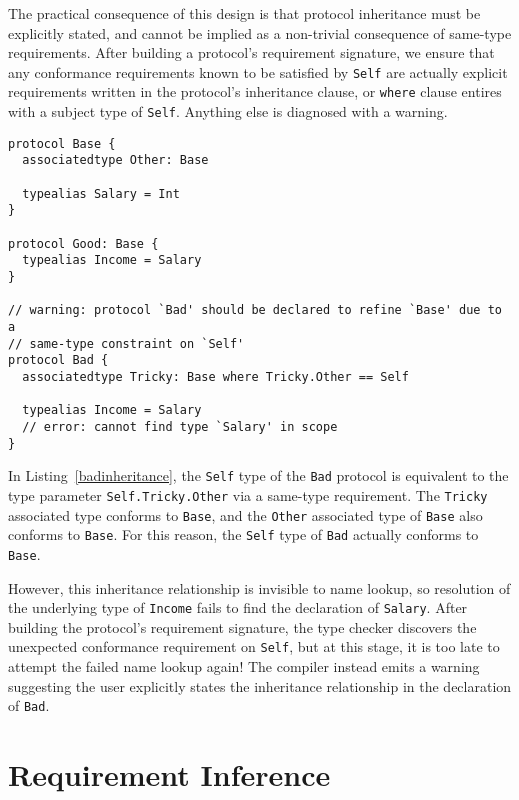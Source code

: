 \documentclass[../generics]{subfiles}
\begin{document}
The practical consequence of this design is that protocol inheritance must be explicitly stated, and cannot be implied as a non-trivial consequence of same-type requirements. After building a protocol's requirement signature, we ensure that any conformance requirements known to be satisfied by \texttt{Self} are actually explicit requirements written in the protocol's inheritance clause, or \texttt{where} clause entires with a subject type of \texttt{Self}. Anything else is diagnosed with a warning.

\begin{listing}\label{badinheritance}
\begin{Verbatim}
protocol Base {
  associatedtype Other: Base
  
  typealias Salary = Int
}

protocol Good: Base {
  typealias Income = Salary
}

// warning: protocol `Bad' should be declared to refine `Base' due to a
// same-type constraint on `Self'
protocol Bad {
  associatedtype Tricky: Base where Tricky.Other == Self
  
  typealias Income = Salary
  // error: cannot find type `Salary' in scope
}
\end{Verbatim}
\end{listing}
\begin{example}
In Listing~\ref{badinheritance}, the \texttt{Self} type of the \texttt{Bad} protocol is equivalent to the type parameter \texttt{Self.Tricky.Other} via a same-type requirement. The \texttt{Tricky} associated type conforms to \texttt{Base}, and the \texttt{Other} associated type of \texttt{Base} also conforms to \texttt{Base}. For this reason, the \texttt{Self} type of \texttt{Bad} actually conforms to \texttt{Base}.

However, this inheritance relationship is invisible to name lookup, so resolution of the underlying type of \texttt{Income} fails to find the declaration of \texttt{Salary}. After building the protocol's requirement signature, the type checker discovers the unexpected conformance requirement on \texttt{Self}, but at this stage, it is too late to attempt the failed name lookup again! The compiler instead emits a warning suggesting the user explicitly states the inheritance relationship in the declaration of \texttt{Bad}.
\end{example}

\section{Requirement Inference}\label{requirementinference}
\end{document}
